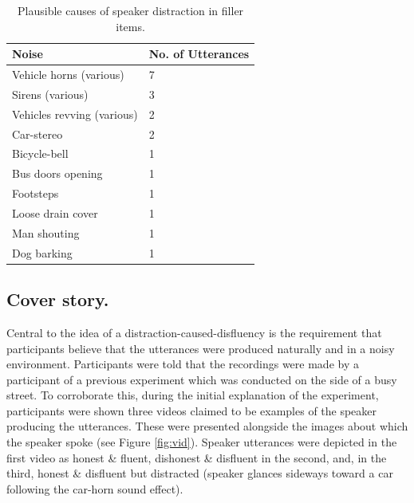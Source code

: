 \documentclass[a4paper,man,natbib]{apa6}
\begin{document}
\begin{table}
\begin{tabularx}{\linewidth}{|X|X|}
\hline
Noise & No. of Utterances\\
\hline
Vehicle horns (various) & 7 \\
Sirens (various) & 3 \\
Vehicles revving (various) & 2 \\
Car-stereo & 2 \\
Bicycle-bell & 1 \\
Bus doors opening & 1 \\
Footsteps & 1 \\
Loose drain cover & 1 \\
Man shouting & 1 \\
Dog barking & 1 \\
\hline
\end{tabularx}
\caption{Plausible causes of speaker distraction in filler items.}
\label{table:fillernoise}
\end{table}


\subsection{Cover story.}
Central to the idea of a distraction-caused-disfluency is the requirement that participants believe that the utterances were produced naturally and in a noisy environment. 
Participants were told that the recordings were made by a participant of a previous experiment which was conducted on the side of a busy street. 
To corroborate this, during the initial explanation of the experiment, participants were shown three videos claimed to be examples of the speaker producing the utterances. 
These were presented alongside the images about which the speaker spoke (see Figure \ref{fig:vid}). 
Speaker utterances were depicted in the first video as honest \& fluent, dishonest \& disfluent in the second, and, in the third, honest \& disfluent but distracted (speaker glances sideways toward a car following the car-horn sound effect).\\
\end{document}

